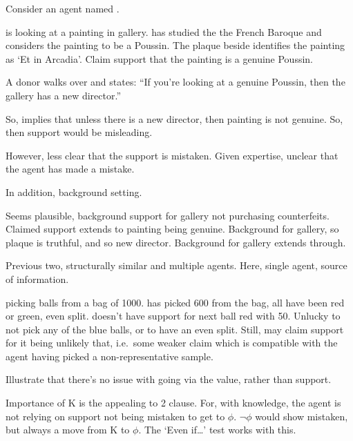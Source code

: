 \begin{note}
  Consider an agent named .

   is looking at a painting in gallery.
   has studied the the French Baroque and considers the painting to be a Poussin.
  The plaque beside identifies the painting as `Et in Arcadia'.
  Claim support that the painting is a genuine Poussin.

  A donor walks over and states:
  ``If you're looking at a genuine Poussin, then the gallery has a new director.''

  So, implies that unless there is a new director, then painting is not genuine.
  So, then support would be misleading.

  However, less clear that the support is mistaken.
  Given expertise, unclear that the agent has made a mistake.

  In addition, background setting.

  Seems plausible, background support for gallery not purchasing counterfeits.
  Claimed support extends to painting being genuine.
  Background for gallery, so plaque is truthful, and so new director.
  Background for gallery extends through.
\end{note}

\begin{note}
  Previous two, structurally similar and multiple agents.
  Here, single agent, source of information.
\end{note}

\begin{note}
   picking balls from a bag of 1000.
   has picked 600 from the bag, all have been red or green, even split.
   doesn't have support for next ball red with 50.
  Unlucky to not pick any of the blue balls, or to have an even split.
  Still, may claim support for it being unlikely that, i.e.\ some weaker claim which is compatible with the agent having picked a non-representative sample.
\end{note}

\begin{note}[K scenario]
  Illustrate that there's no issue with going via the value, rather than support.

  Importance of K is the appealing to 2 clause.
  For, with knowledge, the agent is not relying on support not being mistaken to get to \(\phi\).
  \(\lnot\phi\) would show mistaken, but always a move from K to \(\phi\).
  The `Even if\dots' test works with this.
\end{note}

